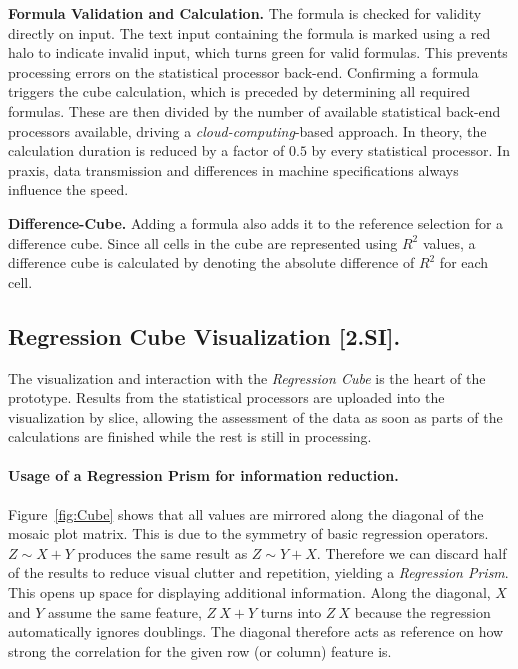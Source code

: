 \documentclass[journal]{style/vgtc} 			          %
\newcommand{\com}[1]{\textcolor{orange}{\uline{#1}}}
\begin{document}
\textbf{Formula Validation and Calculation.} The formula is checked for validity directly on input.
The text input containing the formula is marked using a red halo to indicate invalid input, which turns green for valid formulas.
This prevents processing errors on the statistical processor back-end.
Confirming a formula triggers the cube calculation, which is preceded by determining all required formulas.
These are then divided by the number of available statistical back-end processors available, driving a \emph{cloud-computing}-based approach.
In theory, the calculation duration is reduced by a factor of $0.5$ by every statistical processor.
In praxis, data transmission and differences in machine specifications always influence the speed.

\textbf{Difference-Cube.}
Adding a formula also adds it to the reference selection for a difference cube.
Since all cells in the cube are represented using $R^2$ values, a difference cube is calculated by denoting the absolute difference of $R^2$ for each cell.


\subsection{Regression Cube Visualization [2.SI].}
The visualization and interaction with the \emph{Regression Cube} is the heart of the prototype.
Results from the statistical processors are uploaded into the visualization by slice, allowing the assessment of the data as soon as parts of the calculations are finished while the rest is still in processing.

\paragraph{Usage of a Regression Prism for information reduction.}
Figure~\ref{fig:Cube} shows that all values are mirrored along the diagonal of the mosaic plot matrix.
This is due to the symmetry of basic regression operators.
$Z \sim X + Y$ produces the same result as $Z \sim Y + X$.
Therefore we can discard half of the results to reduce visual clutter and repetition, yielding a \emph{Regression Prism}.
This opens up space for displaying additional information.
Along the diagonal, $X$ and $Y$ assume the same feature, $Z ~ X + Y$ turns into $Z ~ X$ because the regression automatically ignores doublings.
The diagonal therefore acts as reference on how strong the correlation for the given row (or column) feature is.
\end{document}

